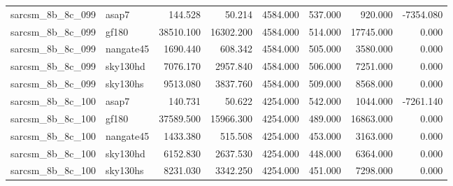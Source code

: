 \begin{tabular}{llrrrrrr}
sarcsm\_8b\_8c\_099 & asap7 & 144.528 & 50.214 & 4584.000 & 537.000 & 920.000 & -7354.080 \\
sarcsm\_8b\_8c\_099 & gf180 & 38510.100 & 16302.200 & 4584.000 & 514.000 & 17745.000 & 0.000 \\
sarcsm\_8b\_8c\_099 & nangate45 & 1690.440 & 608.342 & 4584.000 & 505.000 & 3580.000 & 0.000 \\
sarcsm\_8b\_8c\_099 & sky130hd & 7076.170 & 2957.840 & 4584.000 & 506.000 & 7251.000 & 0.000 \\
sarcsm\_8b\_8c\_099 & sky130hs & 9513.080 & 3837.760 & 4584.000 & 509.000 & 8568.000 & 0.000 \\
sarcsm\_8b\_8c\_100 & asap7 & 140.731 & 50.622 & 4254.000 & 542.000 & 1044.000 & -7261.140 \\
sarcsm\_8b\_8c\_100 & gf180 & 37589.500 & 15966.300 & 4254.000 & 489.000 & 16863.000 & 0.000 \\
sarcsm\_8b\_8c\_100 & nangate45 & 1433.380 & 515.508 & 4254.000 & 453.000 & 3163.000 & 0.000 \\
sarcsm\_8b\_8c\_100 & sky130hd & 6152.830 & 2637.530 & 4254.000 & 448.000 & 6364.000 & 0.000 \\
sarcsm\_8b\_8c\_100 & sky130hs & 8231.030 & 3342.250 & 4254.000 & 451.000 & 7298.000 & 0.000 \\
\bottomrule
\end{tabular}

